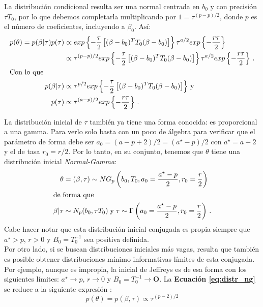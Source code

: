 La distribución condicional resulta ser una normal centrada en $b_0$ y con precisión $\tau T_0$, por lo que debemos completarla multiplicando por $1=\tau^{(p-p)/2}$, donde $p$ es el número de coeficientes, incluyendo a $\beta_0$. Así: 
\begin{align} \label{eq:distr_ng}
p(\theta)= p(\beta|\tau)p(\tau) &\propto exp\left\lbrace -\dfrac{\tau}{2}\left[(\beta-b_0)^TT_0(\beta-b_0)\right] \right\rbrace \tau^{a/2} exp\left\lbrace -\dfrac{r\tau}{2}\right\rbrace \nonumber \\
&\propto \tau^{(p - p)/2} exp\left\lbrace -\dfrac{\tau}{2}\left[(\beta-b_0)^TT_0(\beta-b_0)\right] \right\rbrace \tau^{a/2} exp\left\lbrace -\dfrac{r\tau}{2}\right\rbrace \,. \nonumber\\
\intertext{Con lo que} \nonumber 
p(\beta|\tau) &\propto \tau^{p/2} exp\left\lbrace -\dfrac{\tau}{2}\left[(\beta-b_0)^TT_0(\beta-b_0)\right] \right\rbrace \,\text{y} \nonumber \\
p(\tau) &\propto \tau^{(a-p)/2} exp\left\lbrace -\dfrac{r\tau}{2}\right\rbrace \,.
\end{align}

La distribución inicial de $\tau$ también ya tiene una forma conocida: es proporcional a una gamma. Para verlo solo basta con un poco de álgebra para verificar que el parámetro de forma debe ser $a_0 = (a-p+2)/2=(a^\star-p)/2$ con $a^\star=a+2$ y el de tasa $r_0 = r/2$. Por lo tanto, en su conjunto, tenemos que $\theta$ tiene una distribución inicial \textit{Normal-Gamma}: 
\begin{align} 
\theta &= (\beta,\tau) \sim NG_p\left(b_0,T_0,a_0=\dfrac{a^\star-p}{2},r_0 =\dfrac{r}{2}\right) \nonumber \\
\intertext{de forma que}
\beta|\tau &\sim N_p(b_0,\tau T_0) \;\text{y}\; \tau \sim \Gamma\left(a_0 = \dfrac{a^\star-p}{2}, r_0 = \dfrac{r}{2}\right) \,.
\label{eq:normal_gamma}
\end{align}
Cabe hacer notar que esta distribución inicial conjugada es propia siempre que $a^\star > p $, $r > 0$ y $B_0 = T_0^{-1}$ sea positiva definida.\\ 

Por otro lado, si se buscan distribuciones iniciales más vagas, resulta que también es posible obtener distribuciones mínimo informativas límites de esta conjugada. Por ejemplo, aunque es impropia, la inicial de Jeffreys es de esa forma con los siguientes límites: $a^\star \rightarrow p $, $r \rightarrow 0$ y $B_0 = T_0^{-1} \rightarrow \mathbf{O}$. La \textbf{Ecuación \ref{eq:distr_ng}} se reduce a la siguiente expresión \parencite[14]{GP98}: 
\begin{equation} \label{eq:jeffreys_ng}
p(\theta) = p(\beta,\tau) \propto \tau^{(p-2)/2}
\end{equation}

